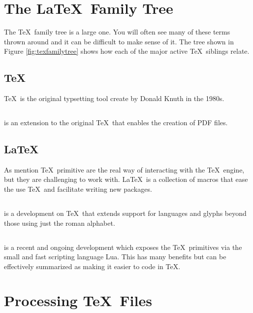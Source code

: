 \documentclass[hidelinks, float=false, crop=false]{standalone}
\begin{document}
    \section{The \LaTeX~Family Tree}
        The \TeX~family tree is a large one. You will often see many of these terms thrown around and it can be difficult to make sense of it.
        The tree shown in Figure \ref{fig:texfamilytree} shows how each of the major active \TeX~siblings relate.
        \subsection{\TeX}
            \TeX~is the original typsetting tool create by Donald Knuth in the 1980s.
        \subsection{}
             is an extension to the original \TeX~that enables the creation of PDF files.
        \subsection{\LaTeX}
            As mention \TeX~primitive are the real way of interacting with the \TeX~engine, but they are challenging to work with.
            \LaTeX~is a collection of macros that ease the use \TeX~and facilitate writing new packages.
        \subsection{}
             is a development on \TeX~that extends support for languages and glyphs beyond those using just the roman alphabet.
        \subsection{}
             is a recent and ongoing development which exposes the \TeX~primitives via the small and fast scripting language Lua.
            This has many benefits but can be effectively summarized as making it easier to code in \TeX.

    \section{Processing \TeX~Files}
\end{document}

